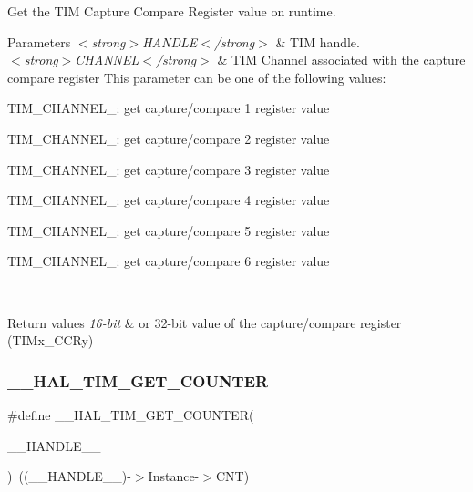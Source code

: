 Get the T\+IM Capture Compare Register value on runtime. 


\begin{DoxyParams}{Parameters}
{\em $<$strong$>$\+H\+A\+N\+D\+L\+E$<$/strong$>$} & T\+IM handle. \\
\hline
{\em $<$strong$>$\+C\+H\+A\+N\+N\+E\+L$<$/strong$>$} & T\+IM Channel associated with the capture compare register This parameter can be one of the following values\+: \begin{DoxyItemize}
\item T\+I\+M\+\_\+\+C\+H\+A\+N\+N\+E\+L\+\_\+: get capture/compare 1 register value \item T\+I\+M\+\_\+\+C\+H\+A\+N\+N\+E\+L\+\_\+: get capture/compare 2 register value \item T\+I\+M\+\_\+\+C\+H\+A\+N\+N\+E\+L\+\_\+: get capture/compare 3 register value \item T\+I\+M\+\_\+\+C\+H\+A\+N\+N\+E\+L\+\_\+: get capture/compare 4 register value \item T\+I\+M\+\_\+\+C\+H\+A\+N\+N\+E\+L\+\_\+: get capture/compare 5 register value \item T\+I\+M\+\_\+\+C\+H\+A\+N\+N\+E\+L\+\_\+: get capture/compare 6 register value \end{DoxyItemize}
\\
\hline
\end{DoxyParams}

\begin{DoxyRetVals}{Return values}
{\em 16-\/bit} & or 32-\/bit value of the capture/compare register (T\+I\+Mx\+\_\+\+C\+C\+Ry) \\
\hline
\end{DoxyRetVals}
\mbox{\label{group___t_i_m___exported___macros_gaf1af08014b9d06efbbb091d58d47c8ba}} 
\subsubsection{\texorpdfstring{\_\_HAL\_TIM\_GET\_COUNTER}{\_\_HAL\_TIM\_GET\_COUNTER}}
{\footnotesize\ttfamily \#define \+\_\+\+\_\+\+H\+A\+L\+\_\+\+T\+I\+M\+\_\+\+G\+E\+T\+\_\+\+C\+O\+U\+N\+T\+ER(\begin{DoxyParamCaption}\item[{}]{\+\_\+\+\_\+\+H\+A\+N\+D\+L\+E\+\_\+\+\_\+ }\end{DoxyParamCaption})~((\+\_\+\+\_\+\+H\+A\+N\+D\+L\+E\+\_\+\+\_\+)-\/$>$Instance-\/$>$C\+NT)}



